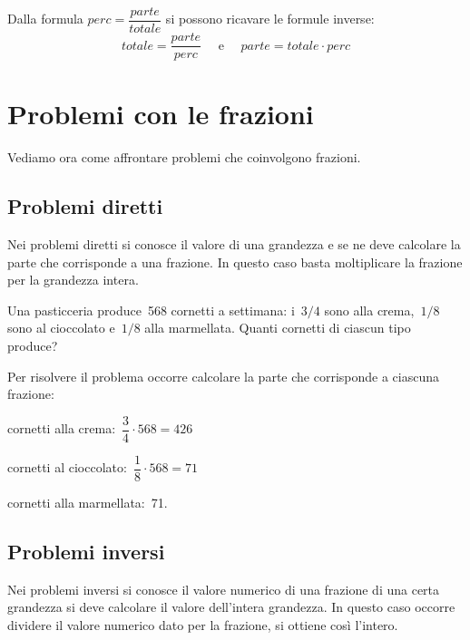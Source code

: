 Dalla formula \(perc = \dfrac{parte}{totale}\) si possono ricavare le 
formule inverse: 
\[totale = \dfrac{parte}{perc} \quad \text{ e } \quad 
  parte = totale \cdot perc\]


\section{Problemi con le frazioni}
\label{sec:razionali_problemi}

Vediamo ora come affrontare problemi che coinvolgono frazioni.

\subsection{Problemi diretti}
Nei problemi diretti si conosce il valore di una grandezza e se ne deve 
calcolare la parte che corrisponde a una frazione. 
In questo caso basta moltiplicare la frazione per la grandezza intera.

\begin{exrig}
 \begin{esempio}
Una pasticceria produce~568 cornetti a settimana: i~$3/4$ sono alla 
crema,~$1/8$ sono al cioccolato e~$1/8$ alla marmellata. 
Quanti cornetti di ciascun tipo produce?

Per risolvere il problema occorre calcolare la parte che corrisponde a 
ciascuna frazione:

\begin{itemize*}
\item cornetti alla crema:~$\dfrac{3}{4}\cdot 568 =426$
\item cornetti al cioccolato:~$\dfrac{1}{8}\cdot 568 =71$
\item cornetti alla marmellata:~71.
\end{itemize*}
 \end{esempio}
\end{exrig}

\subsection{Problemi inversi}

Nei problemi inversi si conosce il valore numerico di una frazione di una 
certa grandezza si deve calcolare il valore dell'intera grandezza.
In questo caso occorre dividere il valore numerico dato per la frazione, 
si ottiene così l'intero.

